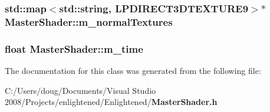 \subsubsection[{m\_\-normalTextures}]{\setlength{\rightskip}{0pt plus 5cm}std::map$<$std::string, LPDIRECT3DTEXTURE9$>$$\ast$ {\bf MasterShader::m\_\-normalTextures}\hspace{0.3cm}{\ttfamily  [protected]}}\label{class_master_shader_aad808d20c01b79a070560263d64541f5}
\subsubsection[{m\_\-time}]{\setlength{\rightskip}{0pt plus 5cm}float {\bf MasterShader::m\_\-time}\hspace{0.3cm}{\ttfamily  [protected]}}\label{class_master_shader_ad7431a0297a89d1505463f4b634fc4ec}


The documentation for this class was generated from the following file:\begin{DoxyCompactItemize}
\item 
C:/Users/doug/Documents/Visual Studio 2008/Projects/enlightened/Enlightened/{\bf MasterShader.h}\end{DoxyCompactItemize}
